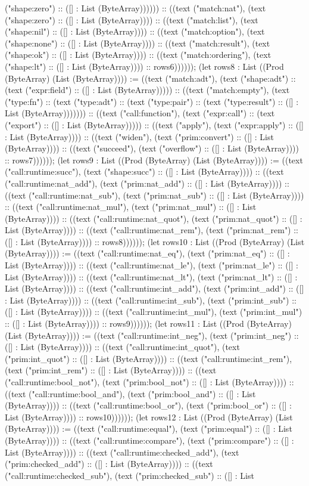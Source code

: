 \documentclass[11pt]{article}
\begin{document}
("shape:zero") :: ([] : List (ByteArray)))))) :: ((text ("match:nat"), (text ("shape:zero") :: ([] : List (ByteArray)))) :: ((text ("match:list"), (text ("shape:nil") :: ([] : List (ByteArray)))) :: ((text ("match:option"), (text ("shape:none") :: ([] : List (ByteArray)))) :: ((text ("match:result"), (text ("shape:ok") :: ([] : List (ByteArray)))) :: ((text ("match:ordering"), (text ("shape:lt") :: ([] : List (ByteArray)))) :: rows6)))))); (let rows8 : List ((Prod (ByteArray) (List (ByteArray)))) := ((text ("match:adt"), (text ("shape:adt") :: (text ("expr:field") :: ([] : List (ByteArray))))) :: ((text ("match:empty"), (text ("type:fn") :: (text ("type:adt") :: (text ("type:pair") :: (text ("type:result") :: ([] : List (ByteArray))))))) :: ((text ("call:function"), (text ("expr:call") :: (text ("export") :: ([] : List (ByteArray))))) :: ((text ("apply"), (text ("expr:apply") :: ([] : List (ByteArray)))) :: ((text ("widen"), (text ("prim:convert") :: ([] : List (ByteArray)))) :: ((text ("succeed"), (text ("overflow") :: ([] : List (ByteArray)))) :: rows7)))))); (let rows9 : List ((Prod (ByteArray) (List (ByteArray)))) := ((text ("call:runtime:succ"), (text ("shape:succ") :: ([] : List (ByteArray)))) :: ((text ("call:runtime:nat\_add"), (text ("prim:nat\_add") :: ([] : List (ByteArray)))) :: ((text ("call:runtime:nat\_sub"), (text ("prim:nat\_sub") :: ([] : List (ByteArray)))) :: ((text ("call:runtime:nat\_mul"), (text ("prim:nat\_mul") :: ([] : List (ByteArray)))) :: ((text ("call:runtime:nat\_quot"), (text ("prim:nat\_quot") :: ([] : List (ByteArray)))) :: ((text ("call:runtime:nat\_rem"), (text ("prim:nat\_rem") :: ([] : List (ByteArray)))) :: rows8)))))); (let rows10 : List ((Prod (ByteArray) (List (ByteArray)))) := ((text ("call:runtime:nat\_eq"), (text ("prim:nat\_eq") :: ([] : List (ByteArray)))) :: ((text ("call:runtime:nat\_le"), (text ("prim:nat\_le") :: ([] : List (ByteArray)))) :: ((text ("call:runtime:nat\_lt"), (text ("prim:nat\_lt") :: ([] : List (ByteArray)))) :: ((text ("call:runtime:int\_add"), (text ("prim:int\_add") :: ([] : List (ByteArray)))) :: ((text ("call:runtime:int\_sub"), (text ("prim:int\_sub") :: ([] : List (ByteArray)))) :: ((text ("call:runtime:int\_mul"), (text ("prim:int\_mul") :: ([] : List (ByteArray)))) :: rows9)))))); (let rows11 : List ((Prod (ByteArray) (List (ByteArray)))) := ((text ("call:runtime:int\_neg"), (text ("prim:int\_neg") :: ([] : List (ByteArray)))) :: ((text ("call:runtime:int\_quot"), (text ("prim:int\_quot") :: ([] : List (ByteArray)))) :: ((text ("call:runtime:int\_rem"), (text ("prim:int\_rem") :: ([] : List (ByteArray)))) :: ((text ("call:runtime:bool\_not"), (text ("prim:bool\_not") :: ([] : List (ByteArray)))) :: ((text ("call:runtime:bool\_and"), (text ("prim:bool\_and") :: ([] : List (ByteArray)))) :: ((text ("call:runtime:bool\_or"), (text ("prim:bool\_or") :: ([] : List (ByteArray)))) :: rows10)))))); (let rows12 : List ((Prod (ByteArray) (List (ByteArray)))) := ((text ("call:runtime:equal"), (text ("prim:equal") :: ([] : List (ByteArray)))) :: ((text ("call:runtime:compare"), (text ("prim:compare") :: ([] : List (ByteArray)))) :: ((text ("call:runtime:checked\_add"), (text ("prim:checked\_add") :: ([] : List (ByteArray)))) :: ((text ("call:runtime:checked\_sub"), (text ("prim:checked\_sub") :: ([] : List 
\end{document}
